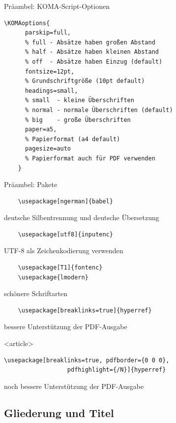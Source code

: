 \begin{Frame}[fragile]{Präambel: KOMA-Script-Optionen}
  \begin{lstlisting}[gobble=4]
    \KOMAoptions{
      parskip=full,
      % full - Absätze haben großen Abstand
      % half - Absätze haben kleinen Abstand
      % off  - Absätze haben Einzug (default)
      fontsize=12pt,
      % Grundschriftgröße (10pt default)
      headings=small,
      % small  - kleine Überschriften
      % normal - normale Überschriften (default)
      % big    - große Überschriften
      paper=a5,
      % Papierformat (a4 default)
      pagesize=auto
      % Papierformat auch für PDF verwenden
    }
  \end{lstlisting}
\end{Frame}

\begin{Frame}[fragile]{Präambel: Pakete}
  \begin{lstlisting}
    \usepackage[ngerman]{babel}
  \end{lstlisting}
  deutsche Silbentrennung und deutsche Übersetzung
  \begin{lstlisting}
    \usepackage[utf8]{inputenc}
  \end{lstlisting}
  UTF-8 als Zeichenkodierung verwenden
  \begin{lstlisting}
    \usepackage[T1]{fontenc}
    \usepackage{lmodern}
  \end{lstlisting}
  schönere Schriftarten
  \begin{lstlisting}
    \usepackage[breaklinks=true]{hyperref}
  \end{lstlisting}
  bessere Unterstützung der PDF-Ausgabe
  \begin{onlyenv}<article>
    \begin{lstlisting}[gobble=6]
      \usepackage[breaklinks=true, pdfborder={0 0 0},
                  pdfhighlight={/N}]{hyperref}
    \end{lstlisting}
    noch bessere Unterstützung der PDF-Ausgabe
  \end{onlyenv}
\end{Frame}

\subsection{Gliederung und Titel}

